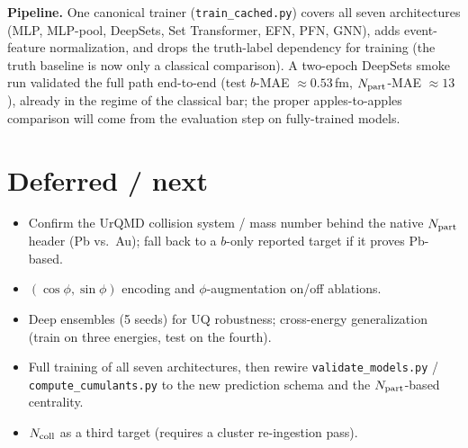 \documentclass[11pt]{article}
\newcommand{\code}[1]{\texttt{#1}}
\begin{document}
\textbf{Pipeline.} One canonical trainer (\code{train\_cached.py}) covers all seven
architectures (MLP, MLP-pool, DeepSets, Set Transformer, EFN, PFN, GNN), adds
event-feature normalization, and drops the truth-label dependency for training
(the truth baseline is now only a classical comparison). A two-epoch DeepSets
smoke run validated the full path end-to-end (test $b$-MAE $\approx0.53$\,fm,
$N_{\rm part}$-MAE $\approx13$), already in the regime of the classical bar; the
proper apples-to-apples comparison will come from the evaluation step on
fully-trained models.

\section{Deferred / next}
\begin{itemize}
  \item Confirm the UrQMD collision system / mass number behind the native
        $N_{\rm part}$ header (Pb vs.\ Au); fall back to a $b$-only reported target
        if it proves Pb-based.
  \item $(\cos\phi,\sin\phi)$ encoding and $\phi$-augmentation on/off ablations.
  \item Deep ensembles (5 seeds) for UQ robustness; cross-energy generalization
        (train on three energies, test on the fourth).
  \item Full training of all seven architectures, then rewire
        \code{validate\_models.py} / \code{compute\_cumulants.py} to the new
        prediction schema and the $N_{\rm part}$-based centrality.
  \item $N_{\rm coll}$ as a third target (requires a cluster re-ingestion pass).
\end{itemize}
\end{document}

